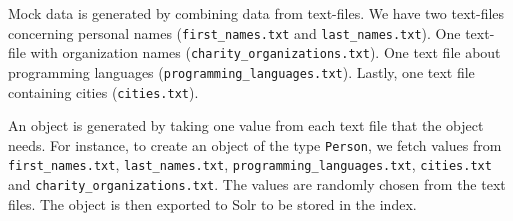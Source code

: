 Mock data is generated by combining data from text-files. We have two text-files concerning personal names (\texttt{first\_names.txt} and \texttt{last\_names.txt}). One text-file with organization names (\texttt{charity\_organizations.txt}). One text file about programming languages (\texttt{programming\_languages.txt}). Lastly, one text file containing cities (\texttt{cities.txt}). 

An object is generated by taking one value from each text file that the object needs. For instance, to create an object of the type \texttt{Person}, we fetch values from \texttt{first\_names.txt}, \texttt{last\_names.txt}, \texttt{programming\_languages.txt}, \texttt{cities.txt} and \texttt{charity\_organizations.txt}. The values are randomly chosen from the text files. The object is then exported to Solr to be stored in the index.